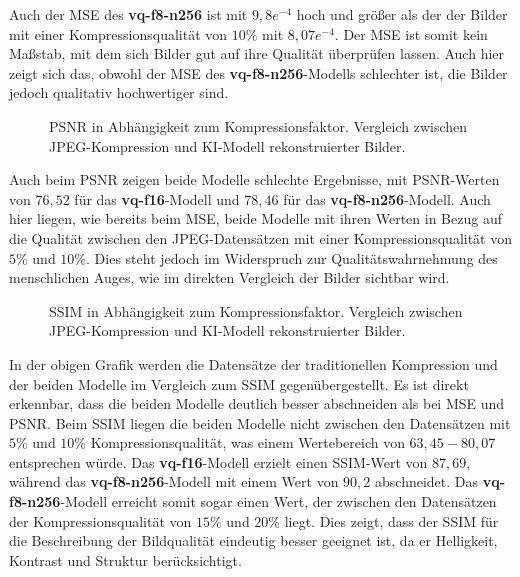             Auch der MSE des \textbf{vq-f8-n256} ist mit $9,8e^{-4}$ hoch und größer als der der Bilder mit einer Kompressionsqualität von $10\%$ mit $8,07e^{-4}$. Der MSE ist somit kein Maßstab, mit dem sich Bilder gut auf ihre Qualität überprüfen lassen. Auch hier zeigt sich das, obwohl der MSE des \textbf{vq-f8-n256}-Modells schlechter ist, die Bilder jedoch qualitativ hochwertiger sind.

            \begin{figure}[!htb]
                \centering
                
                \caption{PSNR in Abhängigkeit zum Kompressionsfaktor. Vergleich zwischen JPEG-Kompression und KI-Modell rekonstruierter Bilder.}
                \label{fig:output_plot_psnr_model}
            \end{figure}

            Auch beim PSNR zeigen beide Modelle schlechte Ergebnisse, mit PSNR-Werten von $76,52$ für das \textbf{vq-f16}-Modell und $78,46$ für das \textbf{vq-f8-n256}-Modell. Auch hier liegen, wie bereits beim MSE, beide Modelle mit ihren Werten in Bezug auf die Qualität zwischen den JPEG-Datensätzen mit einer Kompressionsqualität von $5\%$ und $10\%$. Dies steht jedoch im Widerspruch zur Qualitätswahrnehmung des menschlichen Auges, wie im direkten Vergleich der Bilder sichtbar wird.
\newpage
            \begin{figure}[!htb]
                \centering
                
                \caption{SSIM in Abhängigkeit zum Kompressionsfaktor. Vergleich zwischen JPEG-Kompression und KI-Modell rekonstruierter Bilder.}
                \label{fig:output_plot_ssim_model}
            \end{figure}

            In der obigen Grafik werden die Datensätze der traditionellen Kompression und der beiden Modelle im Vergleich zum SSIM gegenübergestellt. Es ist direkt erkennbar, dass die beiden Modelle deutlich besser abschneiden als bei MSE und PSNR. Beim SSIM liegen die beiden Modelle nicht zwischen den Datensätzen mit $5\%$ und $10\%$ Kompressionsqualität, was einem Wertebereich von $63,45 - 80,07$ entsprechen würde. Das \textbf{vq-f16}-Modell erzielt einen SSIM-Wert von $87,69$, während das \textbf{vq-f8-n256}-Modell mit einem Wert von $90,2$ abschneidet. Das \textbf{vq-f8-n256}-Modell erreicht somit sogar einen Wert, der zwischen den Datensätzen der Kompressionsqualität von $15\%$ und $20\%$ liegt.
            Dies zeigt, dass der SSIM für die Beschreibung der Bildqualität eindeutig besser geeignet ist, da er Helligkeit, Kontrast und Struktur berücksichtigt.
            
